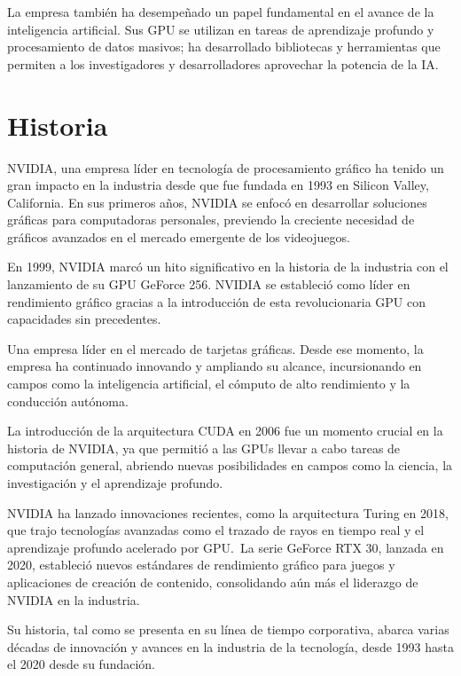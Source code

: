 \documentclass[conference]{IEEEtran}
\begin{document}
La empresa también ha desempeñado un papel fundamental en
el avance de la inteligencia artificial. Sus GPU se utilizan
en tareas de aprendizaje profundo y procesamiento de datos
masivos; ha desarrollado bibliotecas y herramientas que
permiten a los investigadores y desarrolladores aprovechar
la potencia de la IA.\@{}

\section{Historia}

NVIDIA, una empresa líder en tecnología de procesamiento gráfico
ha tenido un gran impacto en la industria desde que fue fundada
en 1993 en Silicon Valley, California. En sus primeros años,
NVIDIA se enfocó en desarrollar soluciones gráficas para
computadoras personales, previendo la creciente necesidad de
gráficos avanzados en el mercado emergente de los videojuegos.

En 1999, NVIDIA marcó un hito significativo en la historia de la
industria con el lanzamiento de su GPU GeForce 256. NVIDIA se
estableció como líder en rendimiento gráfico gracias a la
introducción de esta revolucionaria GPU con capacidades sin
precedentes.

Una empresa líder en el mercado de tarjetas gráficas. Desde ese
momento, la empresa ha continuado innovando y ampliando su alcance,
incursionando en campos como la inteligencia artificial, el cómputo
de alto rendimiento y la conducción autónoma.

La introducción de la arquitectura CUDA en 2006 fue un momento
crucial en la historia de NVIDIA, ya que permitió a las GPUs
llevar a cabo tareas de computación general, abriendo nuevas posibilidades en campos como la ciencia, la investigación y el aprendizaje profundo.

NVIDIA ha lanzado innovaciones recientes, como la arquitectura
Turing en 2018, que trajo tecnologías avanzadas como el trazado
de rayos en tiempo real y el aprendizaje profundo acelerado por
GPU.~La serie GeForce RTX 30, lanzada en 2020,
estableció nuevos estándares de rendimiento gráfico para
juegos y aplicaciones de creación de contenido, consolidando
aún más el liderazgo de NVIDIA en la industria.

Su historia, tal como se presenta en su línea de tiempo
corporativa, abarca varias décadas de innovación y avances
en la industria de la tecnología, desde 1993 hasta el 2020
desde su fundación.
\end{document}
